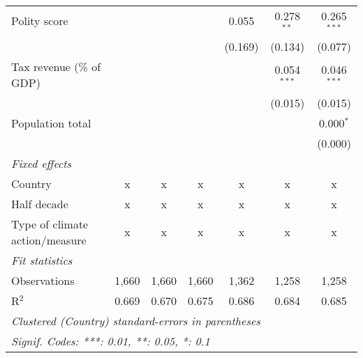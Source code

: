 \begin{tabular}{lcccccc}
   Polity score                                                         &         &         &                & 0.055          & 0.278$^{**}$   & 0.265$^{***}$\\   
                                                                        &         &         &                & (0.169)        & (0.134)        & (0.077)\\   
   Tax revenue (\% of GDP)                                              &         &         &                &                & 0.054$^{***}$  & 0.046$^{***}$\\   
                                                                        &         &         &                &                & (0.015)        & (0.015)\\   
   Population total                                                     &         &         &                &                &                & 0.000$^{*}$\\   
                                                                        &         &         &                &                &                & (0.000)\\   
   \emph{Fixed effects}\\
   Country                                                              & x       & x       & x              & x              & x              & x\\  
   Half decade                                                          & x       & x       & x              & x              & x              & x\\  
   Type of climate action/measure                                       & x       & x       & x              & x              & x              & x\\  
   \midrule \emph{Fit statistics}\\
   Observations                                                         & 1,660   & 1,660   & 1,660          & 1,362          & 1,258          & 1,258\\  
   R$^2$                                                                & 0.669   & 0.670   & 0.675          & 0.686          & 0.684          & 0.685\\  
   \midrule
   \multicolumn{7}{l}{\emph{Clustered (Country) standard-errors in parentheses}}\\
   \multicolumn{7}{l}{\emph{Signif. Codes: ***: 0.01, **: 0.05, *: 0.1}}\\
\end{tabular}
\par\endgroup


